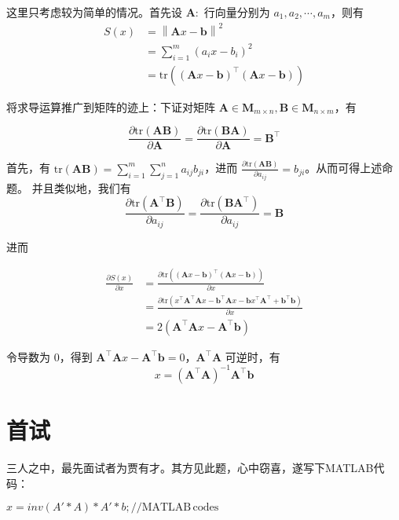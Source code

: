 \begin{solution}
	这里只考虑较为简单的情况。首先设 $\boldsymbol A:$ 行向量分别为 $a_1,a_2,\cdots,a_m$，则有
	\begin{align*}
		S(x) & =\left\|\boldsymbol Ax-\boldsymbol b\right\|^2                      \\
		     & =\sum_{i=1}^m (a_ix-b_i)^2                  \\
		     & =\mathrm{tr}\left((\boldsymbol Ax-\boldsymbol b)^\top (\boldsymbol Ax-\boldsymbol b)\right)
	\end{align*}

	将求导运算推广到矩阵的迹上：下证对矩阵 $\boldsymbol A\in \boldsymbol M_{m\times n},\boldsymbol B\in \boldsymbol M_{n\times m}$，有

	$$\frac{\partial \mathrm{tr}(\boldsymbol A\boldsymbol B)}{\partial \boldsymbol A}=\frac{\partial \mathrm{tr}(\boldsymbol B\boldsymbol A)}{\partial \boldsymbol A}=\boldsymbol B^\top $$

	首先，有 $\mathrm{tr}(\boldsymbol A\boldsymbol B)=\sum_{i=1}^m \sum_{j=1}^n a_{ij}b_{ji}$，进而 $\frac{\partial \mathrm{tr}(\boldsymbol A\boldsymbol B)}{\partial a_{ij} }=b_{ji}$。从而可得上述命题。
	并且类似地，我们有
	$$\frac{\partial \mathrm{tr}(\boldsymbol A^\top \boldsymbol B)}{\partial a_{ij}}=\frac{\partial \mathrm{tr}(\boldsymbol B\boldsymbol A^\top )}{\partial a_{ij}}=\boldsymbol B$$

	进而

	\begin{align*}
		\frac{\partial S(x)}{\partial x} & =\frac{\partial\mathrm{tr}\left((\boldsymbol Ax-\boldsymbol b)^\top (\boldsymbol Ax-\boldsymbol b)\right)}{\partial x} \\
		                                 & =\frac{\partial\mathrm{tr}(x^\top \boldsymbol A^\top \boldsymbol Ax-\boldsymbol b^\top \boldsymbol Ax-\boldsymbol bx^\top \boldsymbol A^\top +\boldsymbol b^\top \boldsymbol b)}{\partial x} \\
		                                 & =2(\boldsymbol A^\top \boldsymbol Ax-\boldsymbol A^\top \boldsymbol b)
	\end{align*}

	令导数为 $0$，得到 $\boldsymbol A^\top \boldsymbol Ax-\boldsymbol A^\top \boldsymbol b=0$，$\boldsymbol A^\top \boldsymbol A$ 可逆时，有
	$$x=(\boldsymbol A^\top \boldsymbol A)^{-1}\boldsymbol A^\top \boldsymbol b$$
\end{solution}

\section{首试}
三人之中，最先面试者为贾有才。其方见此题，心中窃喜，遂写下MATLAB代码：
\begin{solution}
	\hspace{1cm}$x = inv(A'*A)*A'*b; \mathrm{//MATLAB\, codes}$
\end{solution}

